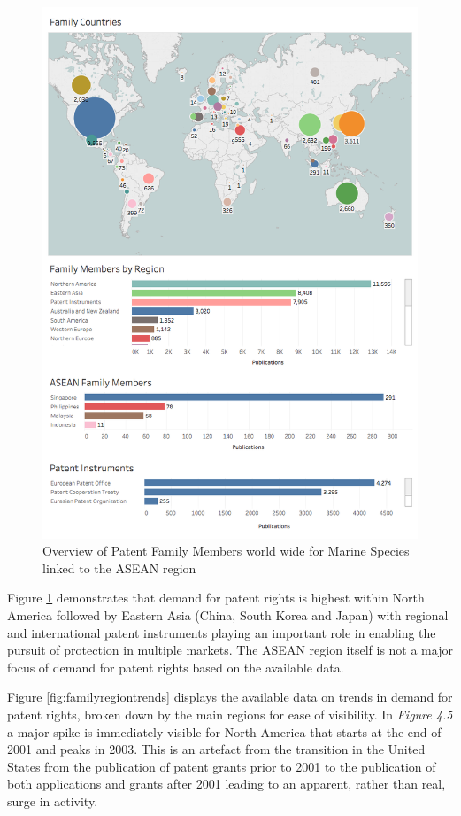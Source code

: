 \documentclass[openany]{book}
\theoremstyle{definition}
\theoremstyle{definition}
\theoremstyle{definition}
\theoremstyle{remark}
\begin{document}
\begin{figure}

{\centering \includegraphics[width=1\linewidth]{images-patents/families} 

}

\caption{Overview of Patent Family Members world wide for Marine Species linked to the ASEAN region}\label{fig:families}
\end{figure}

Figure \ref{fig:families} demonstrates that demand for patent rights is
highest within North America followed by Eastern Asia (China, South
Korea and Japan) with regional and international patent instruments
playing an important role in enabling the pursuit of protection in
multiple markets. The ASEAN region itself is not a major focus of demand
for patent rights based on the available data.

Figure \ref{fig:familyregiontrends} displays the available data on
trends in demand for patent rights, broken down by the main regions for
ease of visibility. In \emph{Figure 4.5} a major spike is immediately
visible for North America that starts at the end of 2001 and peaks in
2003. This is an artefact from the transition in the United States from
the publication of patent grants prior to 2001 to the publication of
both applications and grants after 2001 leading to an apparent, rather
than real, surge in activity.
\end{document}
